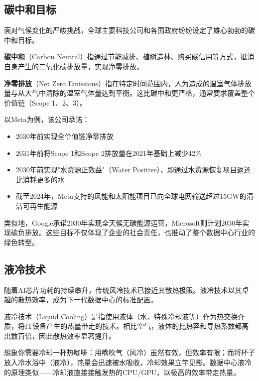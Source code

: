 \subsection{碳中和目标}

面对气候变化的严峻挑战，全球主要科技公司和各国政府纷纷设定了雄心勃勃的碳中和目标。

\begin{definition}[碳中和与净零排放]
\textbf{碳中和}（Carbon Neutral）指通过节能减排、植树造林、购买碳信用等方式，抵消自身产生的二氧化碳排放量，实现净零排放。

\textbf{净零排放}（Net Zero Emissions）指在特定时间范围内，人为造成的温室气体排放量与从大气中清除的温室气体量达到平衡。这比碳中和更严格，通常要求覆盖整个价值链（Scope 1、2、3）。
\end{definition}

以Meta为例，该公司承诺：
\begin{itemize}
    \item 2030年前实现全价值链净零排放
    \item 2031年前将Scope 1和Scope 2排放量在2021年基础上减少42\%
    \item 2030年前实现"水资源正效益"（Water Positive），即通过水资源恢复项目返还比消耗更多的水
    \item 截至2024年，Meta支持的风能和太阳能项目已向全球电网输送超过15GW的清洁可再生能源
\end{itemize}

类似地，Google承诺2030年实现全天候无碳能源运营，Microsoft则计划2030年实现碳负排放。这些目标不仅体现了企业的社会责任，也推动了整个数据中心行业的绿色转型。

\subsection{液冷技术}

随着AI芯片功耗的持续攀升，传统风冷技术已接近其散热极限。液冷技术以其卓越的散热效率，成为下一代数据中心的标准配置。

\begin{definition}[液冷技术]
液冷技术（Liquid Cooling）是指使用液体（水、特殊冷却液等）作为热交换介质，将IT设备产生的热量带走的技术。相比空气，液体的比热容和导热系数都高出数百倍，因此散热效率显著提升。
\end{definition}

\begin{analogy}
想象你需要冷却一杯热咖啡：用嘴吹气（风冷）虽然有效，但效率有限；而将杯子放入冷水浴中（液冷），热量会迅速被水吸收，冷却效果立竿见影。数据中心液冷的原理类似——冷却液直接接触发热的CPU/GPU，以极高的效率带走热量。
\end{analogy}


